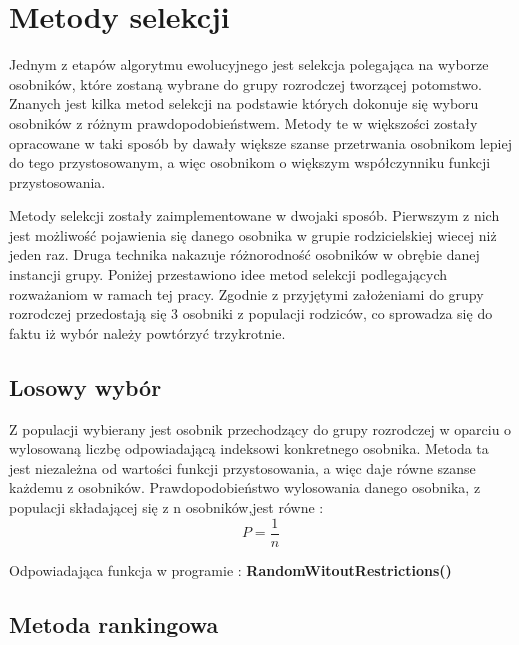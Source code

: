 \chapter{Metody selekcji}\label{metody_selekcji}

Jednym z etapów algorytmu ewolucyjnego jest selekcja polegająca na wyborze osobników, które zostaną wybrane do grupy rozrodczej tworzącej potomstwo. Znanych jest kilka metod selekcji na podstawie których dokonuje się wyboru osobników z różnym prawdopodobieństwem. Metody te w większości zostały opracowane w taki sposób by dawały większe szanse przetrwania osobnikom lepiej do tego przystosowanym, a więc osobnikom o większym współczynniku funkcji przystosowania. 

Metody selekcji zostały zaimplementowane w dwojaki sposób. Pierwszym z nich jest możliwość pojawienia się danego osobnika w grupie rodzicielskiej wiecej niż jeden raz. Druga technika nakazuje różnorodność osobników w obrębie danej instancji grupy. Poniżej przestawiono idee metod selekcji podlegających rozważaniom w ramach tej pracy. Zgodnie z przyjętymi założeniami do grupy rozrodczej przedostają się 3 osobniki z populacji rodziców, co sprowadza się do faktu iż wybór należy powtórzyć trzykrotnie.



\section{Losowy wybór}\label{sec:strukturaDokumentu}

Z populacji wybierany jest osobnik przechodzący do grupy rozrodczej w oparciu o  wylosowaną liczbę odpowiadającą indeksowi konkretnego osobnika. Metoda ta jest niezależna od wartości funkcji przystosowania, a więc daje równe szanse każdemu z osobników. Prawdopodobieństwo wylosowania danego osobnika, z populacji składającej się z n osobników,jest równe :
\vspace{0,4cm}
$$
P = \frac{1}{n}
$$

\par
Odpowiadająca funkcja w programie :\textbf{ RandomWitoutRestrictions()}


\section{Metoda rankingowa}\label{sec:kompilacja}


